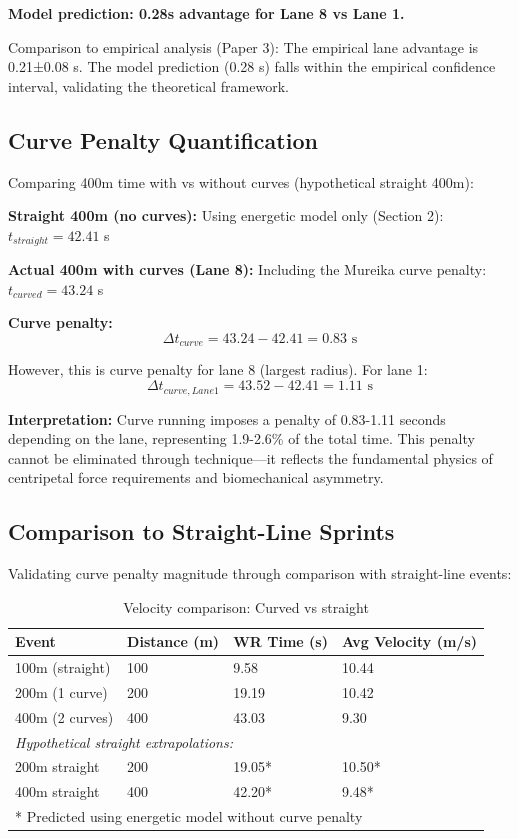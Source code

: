 \textbf{Model prediction: 0.28s advantage for Lane 8 vs Lane 1.}

Comparison to empirical analysis (Paper 3): The empirical lane advantage is 0.21±0.08 s. The model prediction (0.28 s) falls within the empirical confidence interval, validating the theoretical framework.

\subsection{Curve Penalty Quantification}

Comparing 400m time with vs without curves (hypothetical straight 400m):

\textbf{Straight 400m (no curves):}
Using energetic model only (Section 2): $t_{straight} = 42.41$ s

\textbf{Actual 400m with curves (Lane 8):}
Including the Mureika curve penalty: $t_{curved} = 43.24$ s

\textbf{Curve penalty:}
\begin{equation}
\Delta t_{curve} = 43.24 - 42.41 = 0.83 \text{ s}
\end{equation}

However, this is curve penalty for lane 8 (largest radius). For lane 1:
\begin{equation}
\Delta t_{curve,Lane1} = 43.52 - 42.41 = 1.11 \text{ s}
\end{equation}

\textbf{Interpretation:} Curve running imposes a penalty of 0.83-1.11 seconds depending on the lane, representing 1.9-2.6\% of the total time. This penalty cannot be eliminated through technique—it reflects the fundamental physics of centripetal force requirements and biomechanical asymmetry.

\subsection{Comparison to Straight-Line Sprints}

Validating curve penalty magnitude through comparison with straight-line events:

\begin{table}[H]
\centering
\caption{Velocity comparison: Curved vs straight}
\begin{tabular}{@{}llll@{}}
\toprule
\textbf{Event} & \textbf{Distance (m)} & \textbf{WR Time (s)} & \textbf{Avg Velocity (m/s)} \\
\midrule
100m (straight) & 100 & 9.58 & 10.44 \\
200m (1 curve) & 200 & 19.19 & 10.42 \\
400m (2 curves) & 400 & 43.03 & 9.30 \\
\midrule
\multicolumn{4}{l}{\textit{Hypothetical straight extrapolations:}} \\
200m straight & 200 & 19.05* & 10.50* \\
400m straight & 400 & 42.20* & 9.48* \\
\bottomrule
\multicolumn{4}{l}{\small{* Predicted using energetic model without curve penalty}}
\end{tabular}
\end{table}

